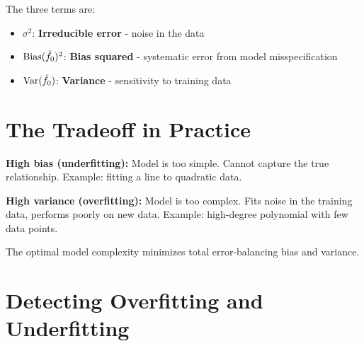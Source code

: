 \documentclass[main.tex]{subfiles}
\begin{document}
The three terms are:
\begin{itemize}
    \item $\sigma^2$: \textbf{Irreducible error} - noise in the data
    \item $\text{Bias}(\hat{f}_0)^2$: \textbf{Bias squared} - systematic error from model misspecification
    \item $\text{Var}(\hat{f}_0)$: \textbf{Variance} - sensitivity to training data
\end{itemize}

\needspace{0.33\textheight}
\section{The Tradeoff in Practice}

\textbf{High bias (underfitting):} Model is too simple. Cannot capture the true relationship. Example: fitting a line to quadratic data.

\textbf{High variance (overfitting):} Model is too complex. Fits noise in the training data, performs poorly on new data. Example: high-degree polynomial with few data points.

\begin{center}
\end{center}

The optimal model complexity minimizes total error-balancing bias and variance.

\needspace{0.33\textheight}
\section{Detecting Overfitting and Underfitting}
\end{document}
